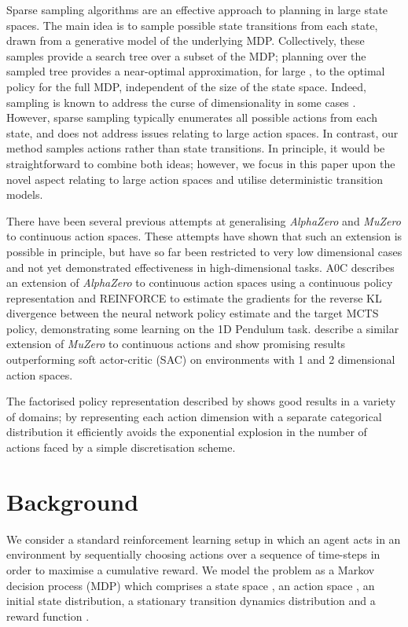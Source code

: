 \documentclass{article}
\newcommand{\alphazero}{\emph{AlphaZero}}
\newcommand{\muzero}{\emph{MuZero}}
\begin{document}
Sparse sampling algorithms \cite{kearns-mansour-ng:sparse-sampling} are an effective approach to planning in large state spaces. The main idea is to sample  possible state transitions from each state, drawn from a generative model of the underlying MDP. Collectively, these samples provide a search tree over a subset of the MDP; planning over the sampled tree provides a near-optimal approximation, for large , to the optimal policy for the full MDP, independent of the size of the state space. Indeed, sampling is known to address the curse of dimensionality in some cases \cite{rust1997}. However, sparse sampling typically enumerates all possible actions from each state, and does not address issues relating to large action spaces. In contrast, our method samples actions rather than state transitions. In principle, it would be straightforward to combine both ideas; however, we focus in this paper upon the novel aspect relating to large action spaces and utilise deterministic transition models.



There have been several previous attempts at generalising \alphazero{} and \muzero{} to continuous action spaces. These attempts have shown that such an extension is possible in principle, but have so far been restricted to very low dimensional cases and not yet demonstrated effectiveness in high-dimensional tasks.
A0C \cite{moerland2018a0c} describes an extension of \alphazero{} to continuous action spaces using a continuous policy representation and REINFORCE \cite{williams1992simple} to estimate the gradients for the reverse KL divergence between the neural network policy estimate and the target MCTS policy, demonstrating some learning on the 1D Pendulum task.
\cite{yang2020continuous} describe a similar extension of \muzero{} to continuous actions and show promising results outperforming soft actor-critic (SAC) \cite{haarnoja2018soft} on environments with 1 and 2 dimensional action spaces.

The factorised policy representation described by \cite{tang2020discretizing} shows good results in a variety of domains; by representing each action dimension with a separate categorical distribution it efficiently avoids the exponential explosion in the number of actions faced by a simple discretisation scheme.


\section{Background}
We consider a standard reinforcement learning setup in which an agent acts in an environment by sequentially choosing actions over a sequence of time-steps in order to maximise a cumulative reward. We model the problem as a Markov decision process (MDP) which comprises a state space , an action space , an initial state distribution, a stationary transition dynamics distribution and a reward function .
\end{document}

